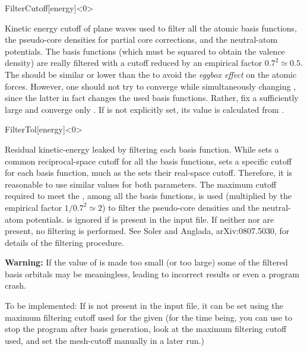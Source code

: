 \begin{fdfentry}{FilterCutoff}[energy]<$0$>

  Kinetic energy cutoff of plane waves used to filter all the atomic
  basis functions, the pseudo-core densities for partial core
  corrections, and the neutral-atom potentials.  The basis functions
  (which must be squared to obtain the valence density) are really
  filtered with a cutoff reduced by an empirical factor
  $0.7^2 \simeq 0.5$. The  should be similar or
  lower than the  to avoid the \emph{eggbox
      effect} on the atomic forces.  However, one should not try to
  converge  while simultaneously changing
  , since the latter in fact changes the used
  basis functions. Rather, fix a sufficiently large
   and converge only .  If
   is not explicitly set, its value is calculated
  from .

\end{fdfentry}

\begin{fdfentry}{FilterTol}[energy]<$0$>

  Residual kinetic-energy leaked by filtering each basis function.
  While  sets a common reciprocal-space cutoff
  for all the basis functions,  sets a specific
  cutoff for each basis function, much as the 
  sets their real-space cutoff. Therefore, it is reasonable to use
  similar values for both parameters.  The maximum cutoff required to
  meet the , among all the basis functions, is used
  (multiplied by the empirical factor $1/0.7^2 \simeq 2$) to filter
  the pseudo-core densities and the neutral-atom
  potentials.  is ignored if 
  is present in the input file.  If neither  nor
   are present, no filtering is performed.  See
  Soler and Anglada, arXiv:0807.5030, for details of the filtering
  procedure.

  \textbf{Warning:} If the value of  is made too
  small (or  too large) some of the filtered basis
  orbitals may be meaningless, leading to incorrect results or even a
  program crash.

  To be implemented: If  is not present in the
  input file, it can be set using the maximum filtering cutoff used
  for the given  (for the time being, you can use
   to stop the program after basis generation,
  look at the maximum filtering cutoff used, and set the mesh-cutoff
  manually in a later run.)

\end{fdfentry}



